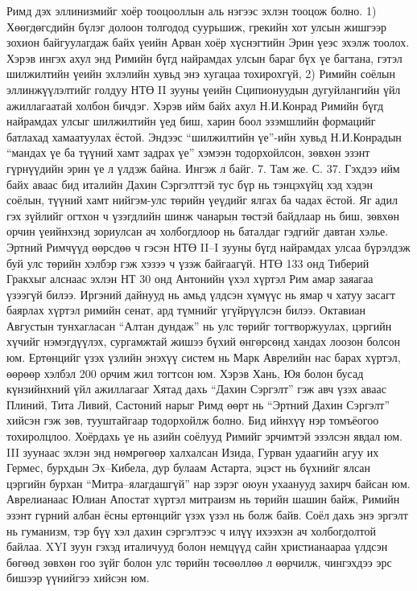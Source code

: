 Римд дэх эллинизмийг хоёр тооцооллын аль нэгээс эхлэн тооцож болно. 1) Хөөгдөгсдийн бүлэг долоон толгодод суурьшиж, грекийн хот улсын жишгээр зохион байгуулагдаж байх үеийн Арван хоёр хүснэгтийн Эрин үеэс эхэлж тоолох. Хэрэв ингэх ахул энд Римийн бүгд найрамдах улсын бараг бүх үе багтана, гэтэл шилжилтийн үеийн эхлэлийн хувьд энэ хугацаа тохирохгүй, 2) Римийн соёлын эллинжүүлэлтийг голдуу НТӨ II зууны үеийн Сципионуудын дугуйлангийн үйл ажиллагаатай холбон бичдэг. Хэрэв ийм байх ахул Н.И.Конрад Римийн бүгд найрамдах улсыг шилжилтийн үед биш, харин боол эзэмшлийн формацийг батлахад хамаатуулах ёстой. Эндээс “шилжилтийн үе”-ийн хувьд Н.И.Конрадын “мандах үе ба түүний хамт задрах үе” хэмээн тодорхойлсон, зөвхөн эзэнт гүрнүүдийн эрин үе л үлдэж байна. Ингэж л байг. 7. Там же. С. 37.
Гэхдээ ийм байх аваас бид италийн Дахин Сэргэлттэй тус бүр нь тэнцэхүйц хэд хэдэн соёлын, түүний хамт нийгэм-улс төрийн үеүдийг ялгах ба чадах ёстой. Яг адил гэх зүйлийг огтхон ч үзэгдлийн шинж чанарын төстэй байдлаар нь биш, зөвхөн орчин үеийнхэнд зориулсан ач холбогдлоор нь баталдаг гэдгийг давтан хэлье.
Эртний Римчүүд өөрсдөө ч гэсэн НТӨ II–I зууны бүгд найрамдах улсаа бүрэлдэж буй улс төрийн хэлбэр гэж хэзээ ч үзэж байгаагүй. НТӨ 133 онд Тиберий Гракхыг алснаас эхлэн НТ 30 онд Антонийн үхэл хүртэл Рим амар заяагаа үзээгүй билээ. Иргэний дайнууд нь амьд үлдсэн хүмүүс нь ямар ч хатуу засагт баярлах хүртэл римийн сенат, ард түмнийг үгүйрүүлсэн билээ.
Октавиан Августын тунхагласан “Алтан дундаж” нь улс төрийг тогтворжуулах, цэргийн хүчийг нэмэгдүүлэх, сургамжтай жишээ бүхий өнгөрсөнд хандах лоозон болсон юм. Ертөнцийг үзэх үзлийн энэхүү систем нь Марк Аврелийн нас барах хүртэл, өөрөөр хэлбэл 200 орчим жил тогтсон юм. Хэрэв Хань, Юя болон бусад күнзийнхний үйл ажиллагааг Хятад дахь “Дахин Сэргэлт” гэж авч үзэх аваас Плиний, Тита Ливий, Састоний нарыг Римд өөрт нь “Эртний Дахин Сэргэлт” хийсэн гэж зөв, тууштайгаар тодорхойлж болно. Бид ийнхүү нэр томъёогоо тохиролцлоо.
Хоёрдахь үе нь азийн соёлууд Римийг эрчимтэй эзэлсэн явдал юм. III зуунаас эхлэн энд нөмрөгөөр халхалсан Изида, Гурван удаагийн агуу их Гермес, бурхдын Эх–Кибела, дур булаам Астарта, эцэст нь бүхнийг ялсан цэргийн бурхан “Митра–ялагдашгүй” нар зэрэг оюун ухаанууд захирч байсан юм. Аврелианаас Юлиан Апостат хүртэл митраизм нь төрийн шашин байж, Римийн эзэнт гүрний албан ёсны ертөнцийг үзэх үзэл нь болж байв. Соёл дахь энэ эргэлт нь гуманизм, тэр бүү хэл дахин сэргэлтээс ч илүү ихээхэн ач холбогдолтой байлаа. XYI зуун гэхэд италичууд болон немцүүд сайн христианаараа үлдсэн бөгөөд зөвхөн гоо зүйг болон улс төрийн төсөөллөө л өөрчилж, чингэхдээ эрс бишээр үүнийгээ хийсэн юм.
